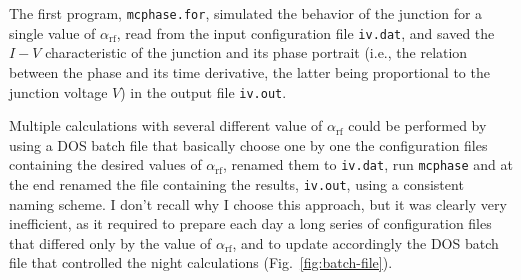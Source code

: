 

The first program, \texttt{mcphase.for}, simulated the behavior of the junction for a single value of $\alpha_\mathrm{rf}$, read from the input configuration file \texttt{iv.dat}, and saved the $I - V$ characteristic of the junction and its phase portrait (i.e., the relation between the phase and its time derivative, the latter being proportional to the junction voltage $V$) in the output file \texttt{iv.out}.

Multiple calculations with several different value of $\alpha_\mathrm{rf}$ could be performed by using a  DOS batch file that basically choose one by one the configuration files containing the desired values of $\alpha_\mathrm{rf}$, renamed them to \texttt{iv.dat}, run \texttt{mcphase} and at the end renamed the file containing the results, \texttt{iv.out}, using a consistent naming scheme.
I don't recall why I choose this approach, but it was clearly very inefficient, as it required to prepare each day a long series of configuration files that differed only by the value of $\alpha_\mathrm{rf}$, and to update accordingly the DOS batch file that controlled the night calculations (Fig.~\ref{fig:batch-file}).



